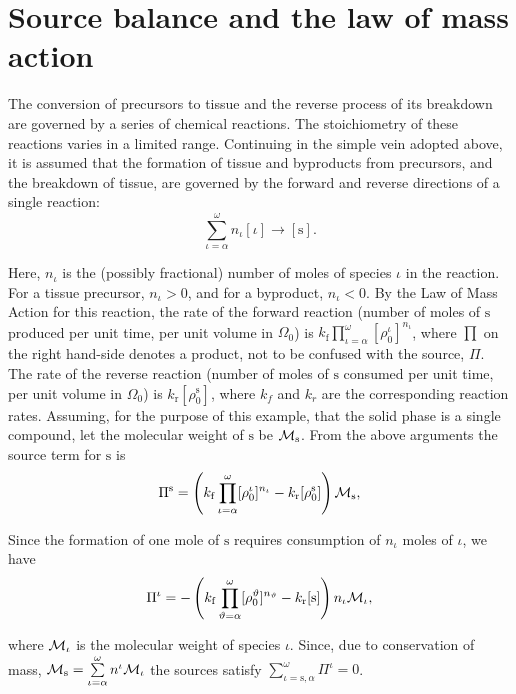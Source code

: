 \chapter{Source balance and the law of mass action}
\label{law-of-mass-action}

The conversion of precursors to tissue and the reverse process of
its breakdown are governed by a series of chemical reactions. The
stoichiometry of these reactions varies in a limited range.
Continuing in the simple vein adopted above, it is assumed that
the formation of tissue and byproducts from precursors, and the
breakdown of tissue, are governed by the forward and reverse
directions of a single reaction:
\begin{equation}
\sum\limits_{\iota=\alpha}^{\omega} n_\iota[\iota] \longrightarrow
[\mathrm{s}]. \label{chemreac}
\end{equation}

\noindent Here, $n_\iota$ is the (possibly fractional) number of
moles of species $\iota$ in the reaction. For a tissue precursor,
$n_\iota > 0$, and for a byproduct, $n_\iota < 0$. By the Law of
Mass Action for this reaction, the rate of the forward reaction
(number of moles of $\mathrm{s}$ produced per unit time, per unit
volume in $\Omega_0$) is
$k_\mathrm{f}\prod\limits_{\iota=\alpha}^\omega
[\rho_0^\iota]^{n_\iota}$, where $\prod$ on the right hand-side
denotes a product, not to be confused with the source, $\Pi$. The
rate of the reverse reaction (number of moles of $\mathrm{s}$
consumed per unit time, per unit volume in $\Omega_0$) is
$k_\mathrm{r}[\rho_0^\mathrm{s}]$, where $k_f$ and $k_r$ are the
corresponding reaction rates. Assuming, for the purpose of this
example, that the solid phase is a single compound, let the
molecular weight of $\mathrm{s}$ be ${\mathcal M}_\mathrm{s}$. From the
above arguments the source term for $\mathrm{s}$ is
\begin{equation}
\Pi^\mathrm{s} =
\left(k_\mathrm{f}\prod\limits_{\iota=\alpha}^\omega
[\rho_0^\iota]^{n_\iota} -
k_\mathrm{r}[\rho_0^\mathrm{s}]\right){\mathcal M}_\mathrm{s},
\label{sourceA}
\end{equation}

\noindent Since the formation of one mole of $\mathrm{s}$ requires
consumption of $n_\iota$ moles of $\iota$, we have
\begin{equation}
\Pi^\iota =
-\left(k_\mathrm{f}\prod\limits_{\vartheta=\alpha}^\omega
[\rho_0^\vartheta]^{n_\vartheta} -
k_\mathrm{r}[\mathrm{s}]\right)n_\iota{\mathcal M}_\iota, \label{sourceI}
\end{equation}

\noindent where ${\mathcal M}_\iota$ is the molecular weight of species
$\iota$. Since, due to conservation of mass, ${\mathcal M}_\mathrm{s} =
\sum\limits_{\iota=\alpha}^\omega n^\iota{\mathcal M}_\iota$ the sources
satisfy $\sum\limits_{\iota=\mathrm{s},\alpha}^\omega \Pi^\iota =
0$.
